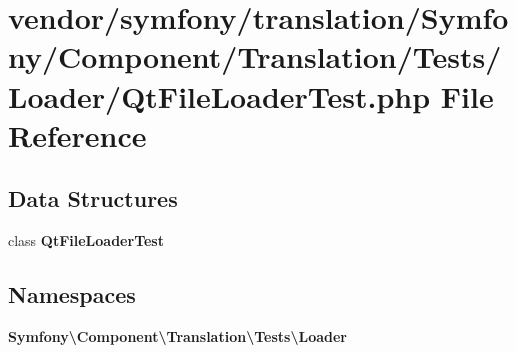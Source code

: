 \section{vendor/symfony/translation/\+Symfony/\+Component/\+Translation/\+Tests/\+Loader/\+Qt\+File\+Loader\+Test.php File Reference}
\label{_qt_file_loader_test_8php}
\subsection*{Data Structures}
\begin{DoxyCompactItemize}
\item 
class {\bf Qt\+File\+Loader\+Test}
\end{DoxyCompactItemize}
\subsection*{Namespaces}
\begin{DoxyCompactItemize}
\item 
 {\bf Symfony\textbackslash{}\+Component\textbackslash{}\+Translation\textbackslash{}\+Tests\textbackslash{}\+Loader}
\end{DoxyCompactItemize}
